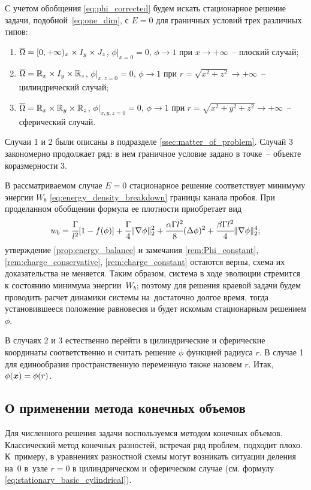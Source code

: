 С учетом обобщения \eqref{eq:phi_corrected} будем искать стационарное решение задачи, подобной~\eqref{eq:one_dim}, с $E = 0$ для граничных условий трех различных типов:
\begin{enumerate}
    \item ${\overline{\Omega}} = [0, +\infty)_x \times I_y \times J_z$, $\phi|_{x = 0} = 0$, $\phi \to 1$ при $x \to +\infty$~-- плоский случай;
    \item ${\overline{\Omega}} = {\mathbb{R}}_x \times I_y \times {\mathbb{R}}_z$, $\phi|_{x, z = 0} = 0$, $\phi \to 1$ при $r = \sqrt{x^2 + z^2} \to +\infty$~-- цилиндрический случай;
    \item ${\overline{\Omega}} = {\mathbb{R}}_x \times {\mathbb{R}}_y \times {\mathbb{R}}_z$, $\phi|_{x, y, z = 0} = 0$, $\phi \to 1$ при $r = \sqrt{x^2 + y^2 + z^2} \to +\infty$~-- сферический случай.
\end{enumerate}
Случаи 1 и 2 были описаны в подразделе \ref{ssec:matter_of_problem}. Случай 3 закономерно продолжает ряд: в нем граничное условие задано в точке~-- объекте коразмерности 3.

В рассматриваемом случае $E = 0$ стационарное решение соответствует минимуму энергии $W_b$ \eqref{eq:energy_density_breakdown} границы канала пробоя. При проделанном обобщении формула ее плотности приобретает вид
\[
    w_b = \cfrac{\Gamma}{l^2} [1 - f(\phi)] + \cfrac{\Gamma}{4} \| \nabla \phi \|_2^2 + \cfrac{\alpha \Gamma l^2}{8}(\Delta \phi)^2 + \cfrac{\beta \Gamma l^2}{4} \| \nabla \phi \|_2^4;
\]
утверждение \ref{prop:energy_balance} и замечания \ref{rem:Phi_constant}, \ref{rem:charge_conservative}, \ref{rem:charge_constant} остаются верны, схема их доказательства не меняется. Таким образом, система в ходе эволюции стремится к состоянию минимума энергии~$W_b$; поэтому для решения краевой задачи будем проводить расчет динамики системы на~достаточно долгое время, тогда установившееся положение равновесия и будет искомым стационарным решением $\phi$.

В случаях 2 и 3 естественно перейти в цилиндрические и сферические координаты соответственно и считать решение $\phi$ функцией радиуса $r$. В случае 1 для единообразия пространственную переменную также назовем $r$. Итак, $\phi({\boldsymbol{x}}) = \phi(r)$.


\subsection{О применении метода конечных объемов}

Для численного решения задачи воспользуемся методом конечных объемов. \linebreak Классический метод конечных разностей, встречая ряд проблем, подходит плохо. К~примеру, в уравнениях разностной схемы могут возникать ситуации деления на~$0$ в~узле $r = 0$ в цилиндрическом и сферическом случае (см. формулу \eqref{eq:stationary_basic_cylindrical}).

